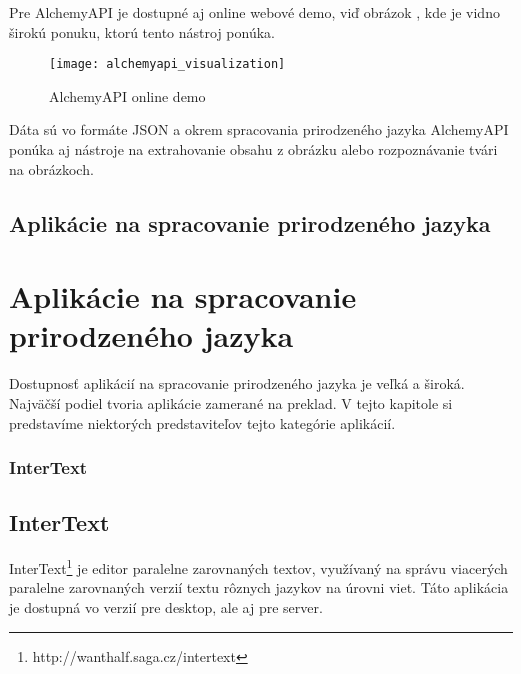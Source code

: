 Pre AlchemyAPI je dostupné aj online webové demo, viď obrázok , kde je vidno širokú ponuku, ktorú tento nástroj ponúka.

\begin{figure}[H]
\begin{center}\texttt{[image: alchemyapi\_visualization]}\end{center}
\caption[AlchemyAPI online demo]{AlchemyAPI online demo}\label{fig:alchemyapi_visualization}
\end{figure}

Dáta sú vo formáte JSON a okrem spracovania prirodzeného jazyka AlchemyAPI ponúka aj nástroje na extrahovanie obsahu z obrázku alebo rozpoznávanie tvári na obrázkoch.

%
%
{
	\subsection{Aplikácie na spracovanie prirodzeného jazyka}
}
{
	\section{Aplikácie na spracovanie prirodzeného jazyka}
}
Dostupnosť aplikácií na spracovanie prirodzeného jazyka je veľká a široká. Najväčší podiel tvoria aplikácie zamerané na preklad. V tejto kapitole si predstavíme niektorých predstaviteľov tejto kategórie aplikácií.

%
%
{
	\subsubsection{InterText}
}
{
	\subsection{InterText}
}
InterText\footnote{http://wanthalf.saga.cz/intertext} je editor paralelne zarovnaných textov, využívaný na správu viacerých paralelne zarovnaných verzií textu rôznych jazykov na úrovni viet. Táto aplikácia je dostupná vo verzií pre desktop, ale aj pre server.

